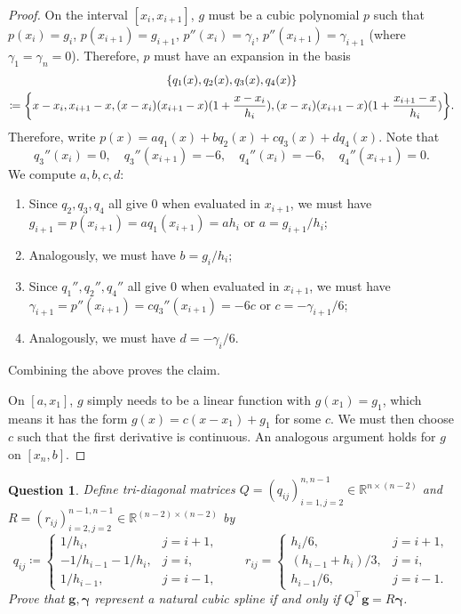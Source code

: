 \documentclass{article}
\theoremstyle{plain}
\newtheorem{question}{Question}
\theoremstyle{remark}
\renewcommand{\vec}{\boldsymbol}
\newcommand{\Bb}{\mathbb}
\newcommand{\RR}{\Bb R}
\newcommand{\T}{^\top} %
\newcommand\ceq\coloneqq %
\begin{document}
\begin{proof}
	On the interval $[x_i, x_{i+1}]$, $g$ must be a cubic polynomial $p$ such that $p(x_i) = g_i$, $p(x_{i+1}) = g_{i+1}$, $p''(x_i) = \gamma_i$, $p''(x_{i+1}) = \gamma_{i+1}$ (where $\gamma_1 = \gamma_n = 0$). Therefore, $p$ must have an expansion in the basis
	\begin{gather*}
	\qty{q_1(x), q_2(x), q_3(x), q_4(x)} \\\ceq \qty{x - x_i, x_{i+1} - x, (x - x_i)(x_{i+1} - x)(1 + \frac{x - x_i}{h_i}), (x - x_i)(x_{i+1} - x) (1 + \frac{x_{i+1} - x}{h_i})}.
	\end{gather*}
Therefore, write $p(x) = a q_1(x) + b q_2(x) + c q_3(x) + d q_4(x)$. Note that 
\[
q_3''(x_i) = 0, \quad q_3''(x_{i+1}) = -6, \quad q_4''(x_i) = -6, \quad q_4''(x_{i+1}) = 0. 
\]
We compute $a, b, c, d$: 
\begin{enumerate}
	\item Since $q_2, q_3, q_4$ all give 0 when evaluated in $x_{i+1}$, we must have $g_{i+1} = p(x_{i+1}) = a q_1(x_{i+1}) = ah_i$ or $a = g_{i+1}/h_i$;
	\item Analogously, we must have $b = g_i / h_i$;
	\item Since $q_1'', q_2'', q_4''$ all give 0 when evaluated in $x_{i+1}$, we must have $\gamma_{i+1} = p''(x_{i+1}) = c q_3''(x_{i+1}) = -6c$ or $c = - \gamma_{i+1}/6$;
	\item Analogously, we must have $d = -\gamma_i / 6$. 
\end{enumerate}
Combining the above proves the claim. 

On $[a, x_1]$, $g$ simply needs to be a linear function with $g(x_1) = g_1$, which means it has the form $g(x) = c(x - x_1) + g_1$ for some $c$. We must then choose $c$ such that the first derivative is continuous. An analogous argument holds for $g$ on $[x_n, b]$. 
\end{proof}

\begin{question}
	Define tri-diagonal matrices $Q = (q_{ij})_{i=1, j=2}^{n,n-1} \in \RR^{n \times (n-2)}$ and $R = (r_{ij})_{i=2, j=2}^{n-1,n-1} \in \RR^{(n-2)\times(n-2)}$ by
	\[
	q_{ij} \ceq \begin{cases}
		1/h_i, & j = i +1, \\ -1/h_{i-1} - 1/h_i, & j = i, \\ 1/h_{i-1}, & j = i- 1, 
	\end{cases}
\qquad r_{ij} = \begin{cases}
	h_i/6, &j = i+1, \\
	(h_{i-1} + h_i)/3, &j=i, \\
	h_{i-1}/6, &j=i-1. 
\end{cases}
	\]
	Prove that $\vec g, \vec \gamma$ represent a natural cubic spline if and only if $Q\T \vec g = R\vec\gamma$. 
\end{question}
\end{document}
